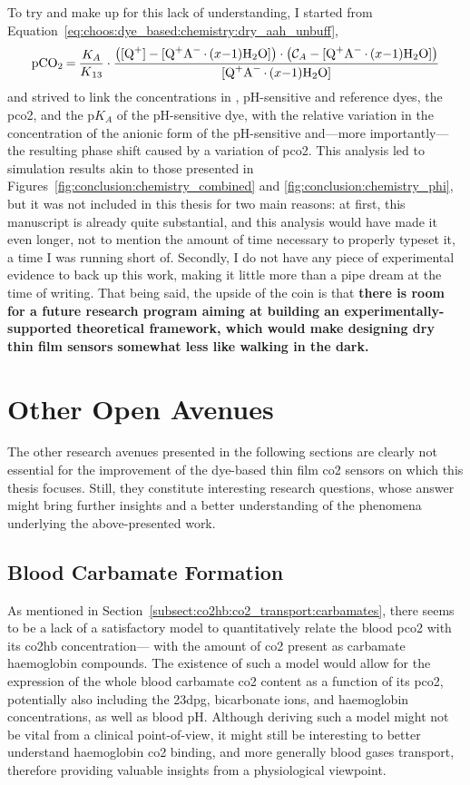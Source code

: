 To try and make up for this lack of understanding, I started from Equation~\ref{eq:choos:dye_based:chemistry:dry_aah_unbuff}, \ie{}
\begin{equation}
	\ce{pCO_2 = \frac{$K_A$}{$K$_{13}}}\cdot \frac{\left(\ce{[Q^+] - [Q^+A^-.$(x-1)$H_2O]}\right)\cdot\left(\ce{$\mathcal{C}_A$ - [Q^+A^-.$(x-1)$H_2O]}\right)}{\ce{[Q^+A^-.$(x-1)$H_2O]}}
\end{equation}
and strived to link the concentrations in , pH-sensitive and reference dyes, the \gls{pco2}, and the p$K_A$ of the pH-sensitive dye, with the relative variation in the concentration of the anionic form of the pH-sensitive and---more importantly---the resulting phase shift caused by a variation of \gls{pco2}. This analysis led to simulation results akin to those presented in Figures~\ref{fig:conclusion:chemistry_combined} and \ref{fig:conclusion:chemistry_phi}, but it was not included in this thesis for two main reasons: at first, this manuscript is already quite substantial, and this analysis would have made it even longer, not to mention the amount of time necessary to properly typeset it, a time I was running short of. Secondly, I do not have any piece of experimental evidence to back up this work, making it little more than a pipe dream at the time of writing. That being said, the upside of the coin is that \textbf{there is room for a future research program aiming at building an experimentally-supported theoretical framework, which would make designing dry thin film sensors somewhat less like walking in the dark.}

\section{Other Open Avenues}\label{sect:conclusion:others}

The other research avenues presented in the following sections are clearly not essential for the improvement of the dye-based thin film \gls{co2} sensors on which this thesis focuses. Still, they constitute interesting research questions, whose answer might bring further insights and a better understanding of the phenomena underlying the above-presented work.

\subsection{Blood Carbamate Formation}

As mentioned in Section~\ref{subsect:co2hb:co2_transport:carbamates}, there seems to be a lack of a satisfactory model to quantitatively relate the blood \gls{pco2} with its \gls{co2hb} concentration---\ie{} with the amount of \gls{co2} present as carbamate haemoglobin compounds. The existence of such a model would allow for the expression of the whole blood carbamate \gls{co2} content as a function of its \gls{pco2}, potentially also including the \gls{23dpg}, bicarbonate ions, and haemoglobin concentrations, as well as blood pH. Although deriving such a model might not be vital from a clinical point-of-view, it might still be interesting to better understand haemoglobin \gls{co2} binding, and more generally blood gases transport, therefore providing valuable insights from a physiological viewpoint.

